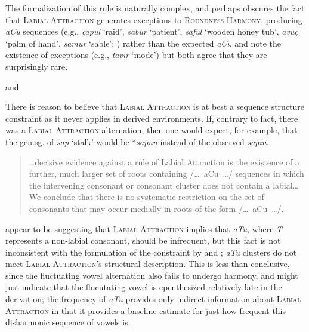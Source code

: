 The formalization of this rule is naturally complex, and perhaps obscures the fact that \textsc{Labial Attraction} generates exceptions to \textsc{Roundness Harmony}, producing \emph{aCu} sequences (e.g., \emph{çapul} `raid', \emph{sabur} `patient', \emph{şaful} `wooden honey tub', \emph{avuç} `palm of hand', \emph{samur} `sable'; \citealp[285]{Lees1966b}) rather than the expected \emph{aCı}. \citet[286]{Lees1966b} and \citet[311]{Zimmer1969} note the existence of exceptions (e.g., \emph{tavır} `mode') but both agree that they are surprisingly rare. 

\citet[225]{Clements1982} and \citet{Inkelas2001}

There is reason to believe that \textsc{Labial Attraction} is at best a sequence structure constraint as it never applies in derived environments. If, contrary to fact, there was a \textsc{Labial Attraction} alternation, then one would expect, for example, that the gen.sg. of \emph{sap} `stalk' would be *\emph{sapun} instead of the observed \emph{sapın}.

\citet{Lees1966a}
\citet{Zimmer1969}

\begin{quote}
\ldots{}decisive evidence against a rule of Labial Attraction is the existence of a further, much larger set of roots containing /\ldots~aCu~\ldots/ sequences in which the intervening consonant or consonant cluster does not contain a labial\ldots We conclude that there is no systematic restriction on the set of consonants that may occur medially in roots of the form /\ldots~aCu~\ldots/. \citep[][225]{Clements1982}
\end{quote}

\noindent
\citeauthor{Clements1982} appear to be suggesting that \textsc{Labial Attraction} implies that \emph{aTu}, where \emph{T} represents a non-labial consonant, should be infrequent, but this fact is not inconsistent with the formulation of the constraint by \citet{Lees1966a,Lees1966b} and \citet{Zimmer1969}; \emph{aTu} clusters do not meet \textsc{Labial Attraction}'s structural description. This is less than conclusive, since the fluctuating vowel alternation also fails to undergo harmony, and might just indicate that the flucutating vowel is epenthesized relatively late in the derivation; the frequency of \emph{aTu} provides only indirect information about \textsc{Labial Attraction} in that it provides a baseline estimate for just how frequent this disharmonic sequence of vowels is.

\citet{Inkelas1997}
\citet{Inkelas2001}

